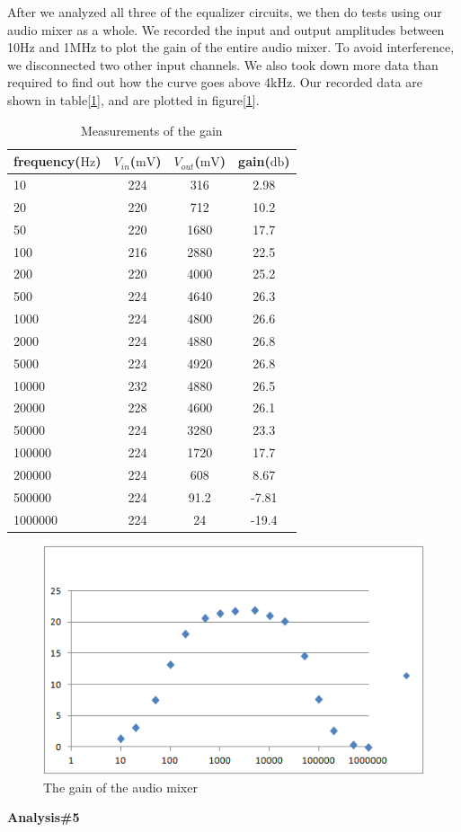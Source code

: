 \phantom{ } After we analyzed all three of the equalizer circuits, we then do tests using our audio mixer as a whole. We recorded the input and output amplitudes between 10Hz and 1MHz to plot the gain of the entire audio mixer. To avoid interference, we disconnected two other input channels. We also took down more data than required to find out how the curve goes above 4kHz. Our recorded data are shown in table[\ref{tab:datagain}], and are plotted in figure[\ref{fig:mixerg}].\\

\begin{table}[!htbp]
	\centering
	\caption{Measurements of the gain}
	\label{tab:datagain}
	\begin{tabular}{lccc}
		\toprule
		frequency($\si{\hertz}$) & $V_{in}$($\si{\milli\volt}$) & $V_{out}$($\si{\milli\volt}$) & gain($\si{\decibel}$) \\
		\midrule
		10	&224&	316&	2.98\\
		20	&220&	712&	10.2\\
		50	&220&	1680&	17.7\\
		100	&216&	2880&	22.5\\
		200	&220&	4000&	25.2\\
		500	&224&	4640&	26.3\\
		1000&	224&	4800&	26.6\\
		2000&	224&	4880&	26.8\\
		5000&	224&	4920&	26.8\\
		10000&	232&	4880&	26.5\\
		20000&	228&	4600&	26.1\\
		50000&	224&	3280&	23.3\\
		100000&	224&	1720&	17.7\\
		200000&	224&	608&	8.67\\
		500000&	224&	91.2&	-7.81\\
		1000000&	224&	24&	-19.4\\
		\bottomrule
	\end{tabular}
\end{table}

\begin{figure}[!htbp]
	\centering
	\begin{framed}
		\includegraphics[width=\linewidth]{images/mixerg.png}
		\caption{The gain of the audio mixer}
		\label{fig:mixerg}
	\end{framed}
\end{figure}

\hfill \newline
\textbf{Analysis\#5} \newline